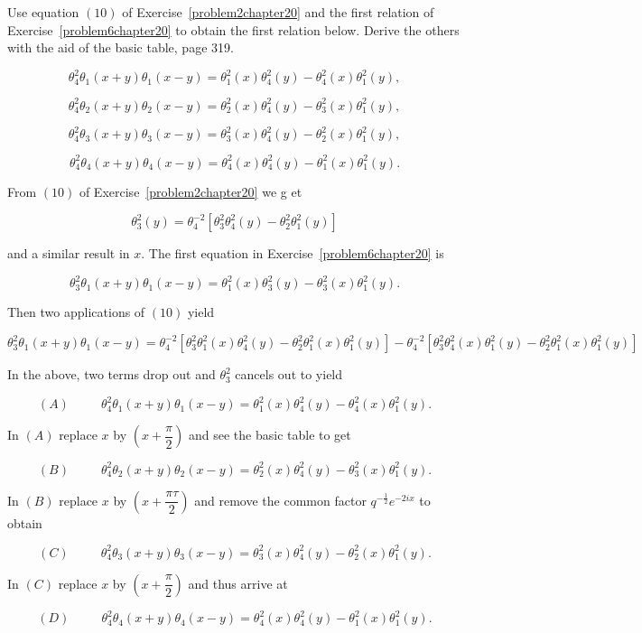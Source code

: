 \begin{problem}\label{problem8chapter20}
Use equation $(10)$ of Exercise~\ref{problem2chapter20} and the first relation of Exercise~\ref{problem6chapter20} to obtain the first relation below. Derive the others with the aid of the basic table, page 319.

$$\theta_4^2\theta_1(x+y)\theta_1(x-y) = \theta_1^2(x)\theta_4^2(y)-\theta_4^2(x)\theta_1^2(y),$$

$$\theta_4^2\theta_2(x+y)\theta_2(x-y)=\theta_2^2(x)\theta_4^2(y)-\theta_3^2(x)\theta_1^2(y),$$

$$\theta_4^2\theta_3(x+y)\theta_3(x-y)=\theta_3^2(x)\theta_4^2(y) - \theta_2^2(x)\theta_1^2(y),$$

$$\theta_4^2\theta_4(x+y)\theta_4(x-y)=\theta_4^2(x)\theta_4^2(y)-\theta_1^2(x)\theta_1^2(y).$$
\end{problem}
\begin{solution}
From $(10)$ of Exercise~\ref{problem2chapter20} we g et

$$\theta_3^2(y) = \theta_4^{-2} [\theta_3^2 \theta_4^2(y) - \theta_2^2 \theta_1^2(y)]$$

and a similar result in $x$. The first equation in Exercise~\ref{problem6chapter20} is

$$\theta_3^2 \theta_1(x+y) \theta_1(x-y) = \theta_1^2(x) \theta_3^2(y) - \theta_3^2(x) \theta_1^2(y).$$

Then two applications of $(10)$ yield

$$\theta_3^2 \theta_1(x+y) \theta_1(x-y) = \theta_4^{-2} [\theta_3^2 \theta_1^2(x) \theta_4^2(y) - \theta_2^2 \theta_1^2(x) \theta_1^2(y)] - \theta_4^{-2} [\theta_3^2 \theta_4^2(x) \theta_1^2(y) - \theta_2^2 \theta_1^2(x) \theta_1^2(y) ]$$

In the above, two terms drop out and $\theta_3^2$ cancels out to yield

$$(A) \hspace{30pt} \theta_4^2 \theta_1(x+y) \theta_1(x-y) = \theta_1^2(x) \theta_4^2(y) - \theta_4^2(x) \theta_1^2(y).$$

In $(A)$ replace $x$ by $\left( x + \dfrac{\pi}{2} \right)$ and see the basic table to get

$$(B) \hspace{30pt} \theta_4^2\theta_2(x+y) \theta_2(x-y) = \theta_2^2(x) \theta_4^2(y) - \theta_3^2(x) \theta_1^2(y).$$

In $(B)$ replace $x$ by $\left( x + \dfrac{\pi \tau}{2} \right)$ and remove the common factor $q^{-\frac{1}{2}} e^{-2ix}$ to obtain

$$(C) \hspace{30pt} \theta_4^2 \theta_3(x+y) \theta_3(x-y) = \theta_3^2(x) \theta_4^2(y) - \theta_2^2(x) \theta_1^2(y).$$

In $(C)$ replace $x$ by $\left( x + \dfrac{\pi}{2} \right)$ and thus arrive at

$$(D) \hspace{30pt} \theta_4^2 \theta_4(x+y) \theta_4(x-y) = \theta_4^2(x) \theta_4^2(y) - \theta_1^2(x) \theta_1^2(y).$$
\end{solution}
